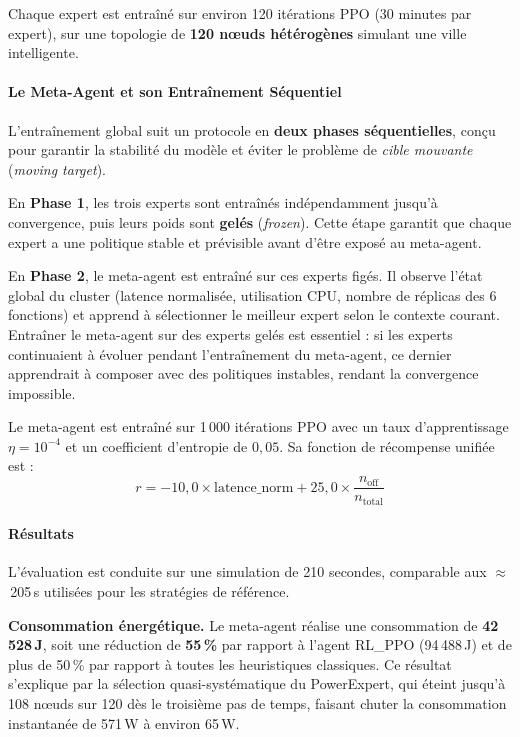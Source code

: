 Chaque expert est entraîné sur environ 120 itérations PPO (30 minutes par expert), sur une topologie de \textbf{120 nœuds hétérogènes} simulant une ville intelligente.

\paragraph{Le Meta-Agent et son Entraînement Séquentiel}

L'entraînement global suit un protocole en \textbf{deux phases séquentielles}, conçu pour garantir la stabilité du modèle et éviter le problème de \textit{cible mouvante} (\textit{moving target}).

En \textbf{Phase 1}, les trois experts sont entraînés indépendamment jusqu'à convergence, puis leurs poids sont \textbf{gelés} (\textit{frozen}). Cette étape garantit que chaque expert a une politique stable et prévisible avant d'être exposé au meta-agent.

En \textbf{Phase 2}, le meta-agent est entraîné sur ces experts figés. Il observe l'état global du cluster (latence normalisée, utilisation CPU, nombre de réplicas des 6 fonctions) et apprend à sélectionner le meilleur expert selon le contexte courant. Entraîner le meta-agent sur des experts gelés est essentiel : si les experts continuaient à évoluer pendant l'entraînement du meta-agent, ce dernier apprendrait à composer avec des politiques instables, rendant la convergence impossible.

Le meta-agent est entraîné sur 1\,000 itérations PPO avec un taux d'apprentissage $\eta = 10^{-4}$ et un coefficient d'entropie de $0{,}05$. Sa fonction de récompense unifiée est :
$$r = -10{,}0 \times \text{latence\_norm} + 25{,}0 \times \frac{n_{\text{off}}}{n_{\text{total}}}$$

\paragraph{Résultats}

L'évaluation est conduite sur une simulation de 210 secondes, comparable aux $\approx$\,205\,s utilisées pour les stratégies de référence.

\textbf{Consommation énergétique.}
Le meta-agent réalise une consommation de \textbf{42\,528\,J}, soit une réduction de \textbf{55\,\%} par rapport à l'agent RL\_PPO (94\,488\,J) et de plus de 50\,\% par rapport à toutes les heuristiques classiques. Ce résultat s'explique par la sélection quasi-systématique du PowerExpert, qui éteint jusqu'à 108 nœuds sur 120 dès le troisième pas de temps, faisant chuter la consommation instantanée de 571\,W à environ 65\,W.

